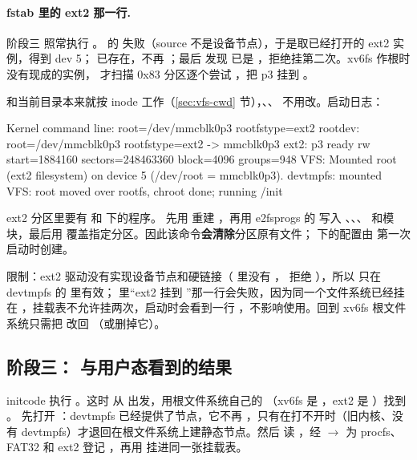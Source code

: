 \paragraph{fstab 里的 ext2 那一行.} 阶段三  照常执行 。 的  失败（source 不是设备节点），于是取已经打开的 ext2 实例，得到 dev 5； 已存在，不再 ；最后  发现  已是 ，拒绝挂第二次。xv6fs 作根时没有现成的实例， 才扫描 0x83 分区逐个尝试 ，把 p3 挂到 。


 和当前目录本来就按 inode 工作（\ref{sec:vfs-cwd} 节），、、 不用改。启动日志：

\begin{txtcode}
Kernel command line: root=/dev/mmcblk0p3 rootfstype=ext2
rootdev: root=/dev/mmcblk0p3 rootfstype=ext2 -> mmcblk0p3
ext2: p3 ready rw start=1884160 sectors=248463360 block=4096 groups=948
VFS: Mounted root (ext2 filesystem) on device 5 (/dev/root = mmcblk0p3).
devtmpfs: mounted
VFS: root moved over rootfs, chroot done; running /init
\end{txtcode}

ext2 分区里要有  和  下的程序。 先用  重建 ，再用 e2fsprogs 的  写入 、、、 和模块，最后用  覆盖指定分区。因此该命令\textbf{会清除}分区原有文件； 下的配置由  第一次启动时创建。

限制：ext2 驱动没有实现设备节点和硬链接（ 里没有 ， 拒绝 ），所以  只在 devtmpfs 的  里有效； 里“ext2 挂到 ”那一行会失败，因为同一个文件系统已经挂在 \code{/}，挂载表不允许挂两次，启动时会看到一行 ，不影响使用。回到 xv6fs 根文件系统只需把  改回 （或删掉它）。

\subsection{阶段三： 与用户态看到的结果}
\label{sec:ns-stage3}

initcode 执行 。这时  从  出发，用根文件系统自己的 （xv6fs 是 ，ext2 是 ）找到 。 先打开 ：devtmpfs 已经提供了节点，它不再 ，只有在打不开时（旧内核、没有 devtmpfs）才退回在根文件系统上建静态节点。然后  读 ，经  $\to$  为 procfs、FAT32 和 ext2 登记 ，再用  挂进同一张挂载表。

